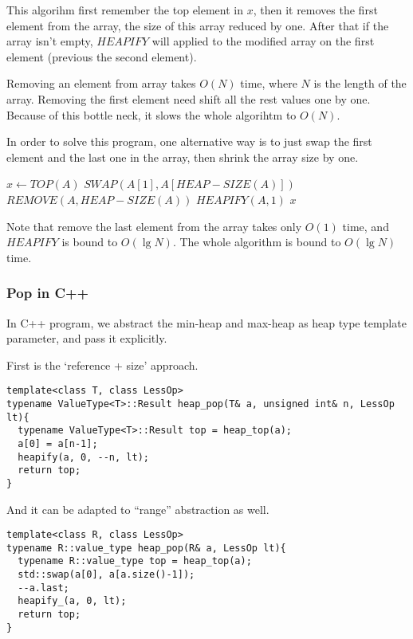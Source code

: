 \documentclass{article}
\begin{document}
This algorihm first remember the top element in $x$, then
it removes the first element from the array, the size of
this array reduced by one. After that if the array isn't 
empty, $HEAPIFY$ will applied to the modified array on
the first element (previous the second element).

Removing an element from array takes $O(N)$ time,
where $N$ is the length of the array. Removing the first
element need shift all the rest values one by one.
Because of this bottle neck, it slows the whole algorihtm
to $O(N)$.

In order to solve this program, one alternative way is 
to just swap the first element and the last one in the
array, then shrink the array size by one.

\begin{algorithmic}[1]
  \State $x \gets TOP(A)$
  \State $SWAP(A[1], A[HEAP-SIZE(A)])$
  \State $REMOVE(A, HEAP-SIZE(A))$
    \State $HEAPIFY(A, 1)$
  \EndIf
  \State \Return $x$
\EndFunction
\end{algorithmic}

Note that remove the last element from the array takes 
only $O(1)$ time, and $HEAPIFY$ is bound to $O(\lg{N})$.
The whole algorithm is bound to $O(\lg{N})$ time.

\subsubsection*{Pop in C++}

In C++ program, we abstract the min-heap and max-heap as heap type
template parameter, and pass it explicitly.

First is the `reference + size' approach.

\lstset{language=C++}
\begin{lstlisting}
template<class T, class LessOp>
typename ValueType<T>::Result heap_pop(T& a, unsigned int& n, LessOp lt){
  typename ValueType<T>::Result top = heap_top(a);
  a[0] = a[n-1];
  heapify(a, 0, --n, lt);
  return top;
}
\end{lstlisting}

And it can be adapted to ``range'' abstraction as well.

\begin{lstlisting}
template<class R, class LessOp>
typename R::value_type heap_pop(R& a, LessOp lt){
  typename R::value_type top = heap_top(a);
  std::swap(a[0], a[a.size()-1]);
  --a.last;
  heapify_(a, 0, lt);
  return top;
}
\end{lstlisting}
\end{document}
